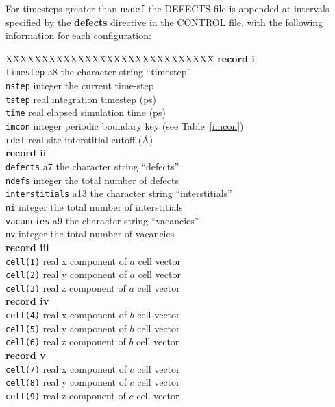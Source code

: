 For timesteps greater than {\tt nsdef} the DEFECTS file is
appended at intervals specified by the {\bf defects} directive in the
CONTROL file, with the following information for each
configuration:
\begin{tabbing}
X\=XXXXXXXXXXXX\=XXXXXXXXXXXXXXXX\=\kill
{\bf record i} \\
\> {\tt timestep}      \> a8      \> the character string ``timestep'' \\
\> {\tt nstep}         \> integer \> the current time-step \\
\> {\tt tstep}         \> real    \> integration timestep (ps) \\
\> {\tt time}          \> real    \> elapsed simulation time (ps) \\
\> {\tt imcon}         \> integer \> periodic boundary key (see Table~\ref{imcon}) \\
\> {\tt rdef}          \> real    \> site-interstitial cutoff (\AA) \\
{\bf record ii} \\
\> {\tt defects}       \> a7      \> the character string ``defects'' \\
\> {\tt ndefs}         \> integer \> the total number of defects \\
\> {\tt interstitials} \> a13     \> the character string ``interstitials'' \\
\> {\tt ni}            \> integer \> the total number of interstitials \\
\> {\tt vacancies}     \> a9      \> the character string ``vacancies'' \\
\> {\tt nv}            \> integer \> the total number of vacancies \\
{\bf record iii} \\
\> {\tt cell(1)}       \> real    \> x component of $a$ cell vector \\
\> {\tt cell(2)}       \> real    \> y component of $a$ cell vector \\
\> {\tt cell(3)}       \> real    \> z component of $a$ cell vector \\
{\bf record iv} \\
\> {\tt cell(4)}       \> real    \> x component of $b$ cell vector \\
\> {\tt cell(5)}       \> real    \> y component of $b$ cell vector \\
\> {\tt cell(6)}       \> real    \> z component of $b$ cell vector \\
{\bf record v} \\
\> {\tt cell(7)}       \> real    \> x component of $c$ cell vector \\
\> {\tt cell(8)}       \> real    \> y component of $c$ cell vector \\
\> {\tt cell(9)}       \> real    \> z component of $c$ cell vector
\end{tabbing}
